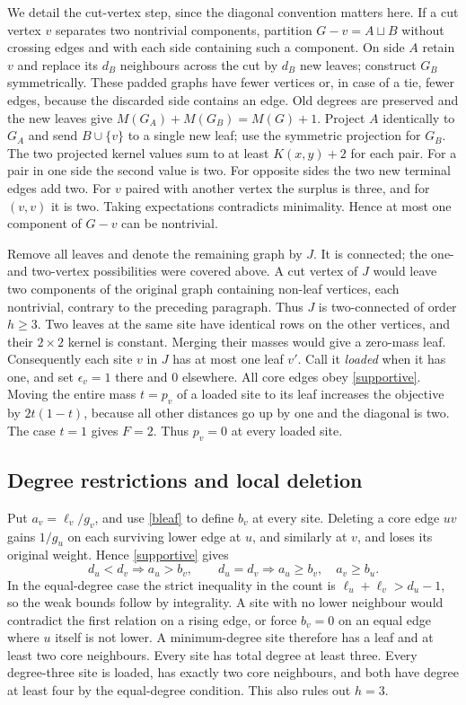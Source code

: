 \documentclass[11pt,a4paper]{article}
\theoremstyle{remark}\newtheorem{remark}[theorem]{Remark}
\begin{document}
We detail the cut-vertex step, since the diagonal convention matters here. If a cut vertex $v$ separates two nontrivial components, partition $G-v=A\sqcup B$ without crossing edges and with each side containing such a component. On side $A$ retain $v$ and replace its $d_B$ neighbours across the cut by $d_B$ new leaves; construct $G_B$ symmetrically. These padded graphs have fewer vertices or, in case of a tie, fewer edges, because the discarded side contains an edge. Old degrees are preserved and the new leaves give $M(G_A)+M(G_B)=M(G)+1$. Project $A$ identically to $G_A$ and send $B\cup\{v\}$ to a single new leaf; use the symmetric projection for $G_B$. The two projected kernel values sum to at least $K(x,y)+2$ for each pair. For a pair in one side the second value is two. For opposite sides the two new terminal edges add two. For $v$ paired with another vertex the surplus is three, and for $(v,v)$ it is two. Taking expectations contradicts minimality. Hence at most one component of $G-v$ can be nontrivial.

Remove all leaves and denote the remaining graph by $J$. It is connected; the one- and two-vertex possibilities were covered above. A cut vertex of $J$ would leave two components of the original graph containing non-leaf vertices, each nontrivial, contrary to the preceding paragraph. Thus $J$ is two-connected of order $h\ge3$. Two leaves at the same site have identical rows on the other vertices, and their $2\times2$ kernel is constant. Merging their masses would give a zero-mass leaf. Consequently each site $v$ in $J$ has at most one leaf $v'$. Call it \emph{loaded} when it has one, and set $\epsilon_v=1$ there and $0$ elsewhere. All core edges obey \eqref{supportive}. Moving the entire mass $t=p_v$ of a loaded site to its leaf increases the objective by $2t(1-t)$, because all other distances go up by one and the diagonal is two. The case $t=1$ gives $F=2$. Thus $p_v=0$ at every loaded site.
\subsection{Degree restrictions and local deletion}
Put $a_v=\ell_v/g_v$, and use \eqref{bleaf} to define $b_v$ at every site. Deleting a core edge $uv$ gains $1/g_u$ on each surviving lower edge at $u$, and similarly at $v$, and loses its original weight. Hence \eqref{supportive} gives
\[
 d_u<d_v\Longrightarrow a_u>b_v,\qquad
 d_u=d_v\Longrightarrow a_u\ge b_v,\quad a_v\ge b_u .
\]
In the equal-degree case the strict inequality in the count is $\ell_u+\ell_v>d_u-1$, so the weak bounds follow by integrality. A site with no lower neighbour would contradict the first relation on a rising edge, or force $b_v=0$ on an equal edge where $u$ itself is not lower. A minimum-degree site therefore has a leaf and at least two core neighbours. Every site has total degree at least three. Every degree-three site is loaded, has exactly two core neighbours, and both have degree at least four by the equal-degree condition. This also rules out $h=3$.
\end{document}
